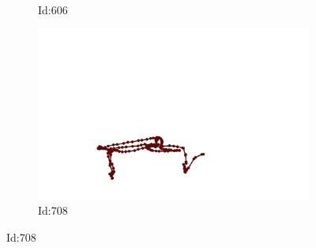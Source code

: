 \documentclass[12pt,twoside]{report}
\begin{document}
\begin{figure}
\begin{subfigure}[b]{0.20\textwidth}
\caption{Id:606}
\end{subfigure}
\begin{subfigure}[b]{0.20\textwidth}
\centering
\includegraphics[width=\textwidth]{../../trajectories/708.png}
\caption{Id:708}
\end{subfigure}
\end{figure}
\end{document}
